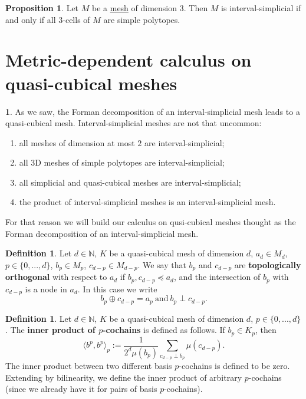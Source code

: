 \documentclass[fleqn]{article}
\theoremstyle{definition}
\newtheorem{proposition}[theorem]{Proposition}
\newtheorem{definition}[theorem]{Definition}
\newtheorem{discussion}[theorem]{}
\newcommand{\N}{\mathbb{N}}
\newcommand{\inner}[2]{\langle#1,#2\rangle}
\begin{document}
\begin{proposition}
  Let $M$ be a \hyperref[idec:mesh:definition]{mesh} of dimension $3$.
  Then $M$ is interval-simplicial if and only if all $3$-cells of $M$
  are simple polytopes.
\end{proposition}

\section{Metric-dependent calculus on quasi-cubical meshes}

\begin{discussion}
  As we saw, the Forman decomposition of an interval-simplicial mesh leads to a
  quasi-cubical mesh.
  Interval-simplicial meshes are not that uncommon:
  \begin{enumerate}
    \item
      all meshes of dimension at most $2$ are interval-simplicial;
    \item
      all $3$D meshes of simple polytopes are interval-simplicial;
    \item
      all simplicial and quasi-cubical meshes are interval-simplicial;
    \item
      the product of interval-simplicial meshes is an interval-simplicial mesh.
  \end{enumerate}
  For that reason we will build our calculus on qusi-cubical meshes thought as
  the Forman decomposition of an interval-simplicial mesh.
\end{discussion}

\begin{definition}
  Let
    $d \in \N$,
    $K$ be a quasi-cubical mesh of dimension $d$,
    $a_d \in M_d$,
    $p \in \{0, ..., d\}$,
    $b_p \in M_p$,
    $c_{d - p} \in M_{d - p}$.
  We say that $b_p$ and $c_{d - p}$ are \textbf{topologically orthogonal}
  with respect to $a_d$ if $b_p, c_{d - p} \preceq a_d$, and the intersection of
  $b_p$ with $c_{d - p}$ is a node in $a_d$.
  In this case we write
  \begin{equation}
    b_p \oplus c_{d - p} = a_p\
    \text{and}\
    b_p \perp c_{d - p}.
  \end{equation}
\end{definition}

\begin{definition}
  Let
    $d \in \N$,
    $K$ be a quasi-cubical mesh of dimension $d$,
    $p \in \{0, ..., d\}$.
  The \textbf{inner product of $p$-cochains} is defined as follows.
  If $b_p \in K_p$, then
  \begin{equation}
    \inner{b^p}{b^p}_p :=
    \frac{1}{2^d \mu(b_p)} \sum_{c_{d - p} \perp b_p} \mu(c_{d - p}).
  \end{equation}
  The inner product between two different basis $p$-cochains
  is defined to be zero.
  Extending by bilinearity, we define the inner product of arbitrary
  $p$-cochains (since we already have it for pairs of basis $p$-cochains).
\end{definition}
\end{document}
